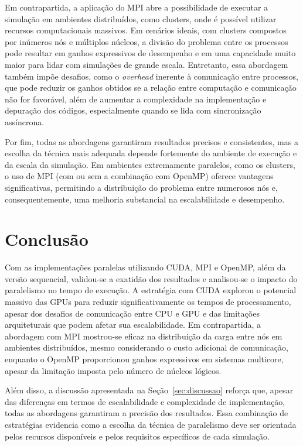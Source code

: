 \documentclass[12pt]{article}
\begin{document}
Em contrapartida, a aplicação do MPI abre a possibilidade de executar a
simulação em ambientes distribuídos, como clusters, onde é possível utilizar
recursos computacionais massivos. Em cenários ideais, com clusters compostos
por inúmeros nós e múltiplos núcleos, a divisão do problema entre os processos
pode resultar em ganhos expressivos de desempenho e em uma capacidade muito
maior para lidar com simulações de grande escala. Entretanto, essa abordagem
também impõe desafios, como o \textit{overhead} inerente à comunicação entre
processos, que pode reduzir os ganhos obtidos se a relação entre computação e
comunicação não for favorável, além de aumentar a complexidade na implementação
e depuração dos códigos, especialmente quando se lida com sincronização
assíncrona.

Por fim, todas as abordagens garantiram resultados precisos e consistentes, mas
a escolha da técnica mais adequada depende fortemente do ambiente de execução e
da escala da simulação. Em ambientes extremamente paralelos, como os clusters,
o uso de MPI (com ou sem a combinação com OpenMP) oferece vantagens
significativas, permitindo a distribuição do problema entre numerosos nós e,
consequentemente, uma melhoria substancial na escalabilidade e desempenho.

\section{Conclusão}

Com as implementações paralelas utilizando CUDA, MPI e OpenMP, além da versão
sequencial, validou-se a exatidão dos resultados e analisou-se o impacto do
paralelismo no tempo de execução. A estratégia com CUDA explorou o potencial
massivo das GPUs para reduzir significativamente os tempos de processamento,
apesar dos desafios de comunicação entre CPU e GPU e das limitações
arquiteturais que podem afetar sua escalabilidade. Em contrapartida, a
abordagem com MPI mostrou-se eficaz na distribuição da carga entre nós em
ambientes distribuídos, mesmo considerando o custo adicional de comunicação,
enquanto o OpenMP proporcionou ganhos expressivos em sistemas multicore, apesar
da limitação imposta pelo número de núcleos lógicos.

Além disso, a discussão apresentada na Seção~\ref{sec:discussao} reforça que,
apesar das diferenças em termos de escalabilidade e complexidade de
implementação, todas as abordagens garantiram a precisão dos resultados. Essa
combinação de estratégias evidencia como a escolha da técnica de paralelismo
deve ser orientada pelos recursos disponíveis e pelos requisitos específicos de
cada simulação.



\nocite{*}
\end{document}
